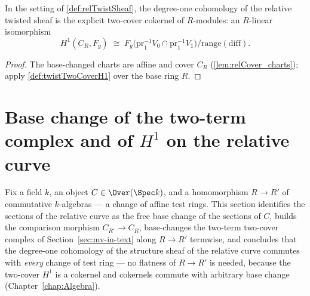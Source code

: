\begin{definition}
  \label{def:relTwistTwoCoverH1}
  \leanok
  In the setting of \ref{def:relTwistSheaf}, the degree-one cohomology of the relative
  twisted sheaf is the explicit two-cover cokernel of \(R\)-modules: an \(R\)-linear
  isomorphism
  \[
    H^1(C_R, F_g) \;\cong\;
      F_g\bigl(\mathrm{pr}_1^{-1}V_0 \cap \mathrm{pr}_1^{-1}V_1\bigr) \big/
        \mathrm{range}(\mathrm{diff}) .
  \]
\end{definition}
\begin{proof}
  \leanok
  The base-changed charts are affine and cover \(C_R\) (\ref{lem:relCover_charts});
  apply \ref{def:twistTwoCoverH1} over the base ring \(R\).
\end{proof}

\section{Base change of the two-term complex and of \(H^1\) on the relative curve}
\label{sec:relative_h1_base_change}

Fix a field \(k\), an object \(C \in \Over(\Spec k)\), and a homomorphism \(R \to R'\) of
commutative \(k\)-algebras --- a change of affine test rings. This section identifies the
sections of the relative curve as the free base change of the sections of \(C\), builds
the comparison morphism \(C_{R'} \to C_R\), base-changes the two-term two-cover complex
of Section~\ref{sec:mv-in-text} along \(R \to R'\) termwise, and concludes that the
degree-one cohomology of the structure sheaf of the relative curve commutes with
\emph{every} change of test ring --- no flatness of \(R \to R'\) is needed, because the
two-cover \(H^1\) is a cokernel and cokernels commute with arbitrary base change
(Chapter~\ref{chap:Algebra}).

